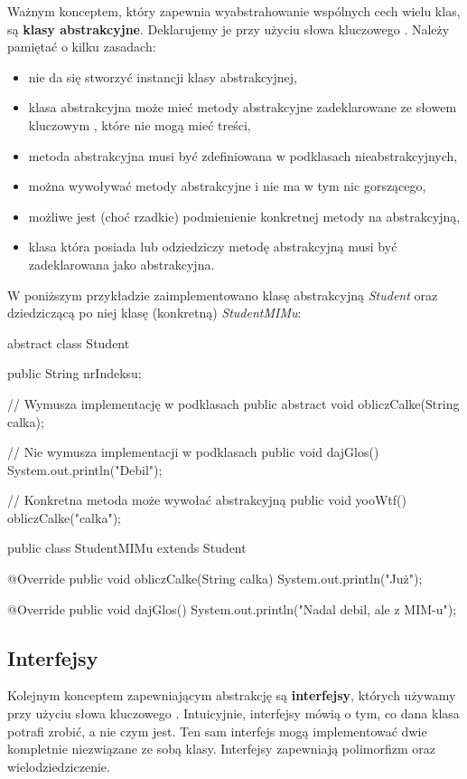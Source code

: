 Ważnym konceptem, który zapewnia wyabstrahowanie wspólnych cech wielu klas, są \textbf{klasy abstrakcyjne}. Deklarujemy je przy użyciu słowa kluczowego . Należy pamiętać o kilku zasadach:
\begin{itemize}
    \item nie da się stworzyć instancji klasy abstrakcyjnej,
    \item klasa abstrakcyjna może mieć metody abstrakcyjne zadeklarowane ze słowem kluczowym , które nie mogą mieć treści,
    \item metoda abstrakcyjna musi być zdefiniowana w podklasach nieabstrakcyjnych,
    \item można wywoływać metody abstrakcyjne i nie ma w tym nic gorszącego,
    \item możliwe jest (choć rzadkie) podmienienie konkretnej metody na abstrakcyjną,
    \item klasa która posiada lub odziedziczy metodę abstrakcyjną musi być zadeklarowana jako abstrakcyjna.
\end{itemize}

\begin{example}
    W poniższym przykładzie zaimplementowano klasę abstrakcyjną \textit{Student} oraz dziedziczącą po niej klasę (konkretną) \textit{StudentMIMu}:
    \begin{java}
    abstract class Student {
        public String nrIndeksu;

        // Wymusza implementację w podklasach
        public abstract void obliczCalke(String calka);

        // Nie wymusza implementacji w podklasach
        public void dajGlos() {
            System.out.println("Debil");
        }

        // Konkretna metoda może wywołać abstrakcyjną
        public void yooWtf(){
            obliczCalke("calka");
        }
    }

    public class StudentMIMu extends Student {
    
        @Override
        public void obliczCalke(String calka) {
            System.out.println("Już");
        }

        @Override
        public void dajGlos() {
            System.out.println("Nadal debil, ale z MIM-u");
        }
    }
\end{java}
\end{example}

\subsection{Interfejsy}
Kolejnym konceptem zapewniającym abstrakcję są \textbf{interfejsy}, których używamy przy użyciu słowa kluczowego . Intuicyjnie, interfejsy mówią o tym, co dana klasa potrafi zrobić, a nie czym jest. Ten sam interfejs mogą implementować dwie kompletnie niezwiązane ze sobą klasy. Interfejsy zapewniają polimorfizm oraz wielodziedziczenie.

